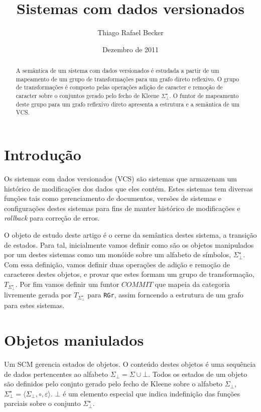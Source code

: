 \documentclass[a4paper]{article}
\title{Sistemas com dados versionados}
\author{Thiago Rafael Becker}
\date{Dezembro de 2011}
\newcommand{\baseset}{{\Sigma^\star_\bot}}
\newcommand{\transMon}{{T_\baseset}}
\newcommand{\composition}{{\circ}}
\begin{document}
\maketitle
\begin{abstract}
A semântica de um sistema com dados versionados é estudada a partir de um mapeamento de um grupo de transformações para um grafo direto reflexivo. O grupo de transformações é composto pelas operações adição de caracter e remoção de caracter sobre o conjuntos gerado pelo fecho de Kleene $\baseset$. O funtor de mapeamento deste grupo para um grafo reflexivo direto apresenta a estrutura e a semântica de um VCS.
\end{abstract}

\section*{Introdução}
Os sistemas com dados versionados (VCS) são sistemas que armazenam um histórico de modificações dos dados que eles contém. Estes sistemas tem diversas funções tais como gerenciamento de documentos, versões de sistemas e configurações destes sistemas para fins de manter histórico de modificações e {\it rollback} para correção de erros.

O objeto de estudo deste artigo é o cerne da semântica destes sistema, a transição de estados. Para tal, inicialmente vamos definir como são os objetos manipulados por um destes sistemas como um monóide sobre um alfabeto de símbolos, $\baseset$. Com essa definição, vamos definir duas operações de adição e remoção de caracteres destes objetos, e provar que estes formam um grupo de transformação, $\transMon$. Por fim vamos definir um funtor $COMMIT$ que mapeia da categoria livremente gerada por $\transMon$ para {\tt RGr}, assim forncendo a estrutura de um grafo para estes sistemas.

\section*{Objetos maniulados} \label{sec:intuitiva}
Um SCM gerencia estados de objetos. O conteúdo destes objetos é uma sequência de dados pertencentes ao alfabeto $\Sigma_\bot = \Sigma \cup \bot$. Todos os estados de um objeto são definidos pelo conjnto gerado pelo fecho de Kleene sobre o alfabeto $\Sigma_\bot$, $\baseset = \langle\Sigma_\bot, \composition, \varepsilon\rangle$. $\bot$ é um elemento especial que indica indefinição das funções parciais sobre o conjunto $\baseset$.
\end{document}
